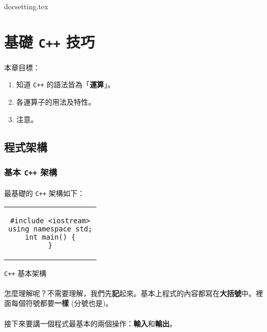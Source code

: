 \documentclass[12pt,a4paper,oneside]{article}
\begin{document}
\begin{CJK}{UTF8}{bkai}

{docsetting.tex}
\setcounter{section}{0}

\fi

\section{基礎 \texttt{C++} 技巧}

\paragraph{}本章目標：
\begin{enumerate}
\item 知道 \texttt{C++} 的語法皆為「\textbf{運算}」。
\item 各運算子的用法及特性。
\item 注意。
\end{enumerate}

\subsection{程式架構}
\subsubsection{基本 \texttt{C++} 架構}

\paragraph{}最基礎的 \texttt{C++} 架構如下：

\begin{code}[h!]
\centering
\begin{tabular}{c}
\begin{lstlisting}
#include <iostream>
using namespace std;
int main() {
}
\end{lstlisting}
\end{tabular}
\caption{\texttt{C++} 基本架構}
\label{basic:cpp:code:main}
\end{code}

\paragraph{}怎麼理解呢？不需要理解，我們先\textbf{記}起來。基本上程式的內容都寫在\textbf{大括號}中。裡面每個符號都要\textbf{一樣} (分號也是)。
\paragraph{}接下來要講一個程式最基本的兩個操作：\textbf{輸入}和\textbf{輸出}。


\end{CJK}
\end{document}
